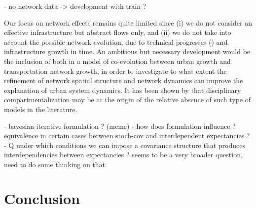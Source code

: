 \documentclass[Royal,sageh,times]{sagej}
\begin{document}
- no network data -> development with train ?

Our focus on network effects remains quite limited since (i) we do not consider an effective infrastructure but abstract flows only, and (ii) we do not take into account the possible network evolution, due to technical progresses (\cite{bretagnolle2000long}) and infrastructure growth in time. An ambitious but necessary development would be the inclusion of both in a model of co-evolution between urban growth and transportation network growth, in order to investigate to what extent the refinement of network spatial structure and network dynamics can improve the explanation of urban system dynamics. It has been shown by \cite{raimbault2016models} that disciplinary compartmentalization may be at the origin of the relative absence of such type of models in the literature.



- bayesian iterative formulation ? (mcmc)
- how does formulation influence ? equivalence in certain cases between stoch-cov and interdependent expectancies ?
- Q under which conditions we can impose a covariance structure that produces interdependencies between expectancies ? seems to be a very broader question, need to do some thinking on that.




\section*{Conclusion}


















\end{document}

